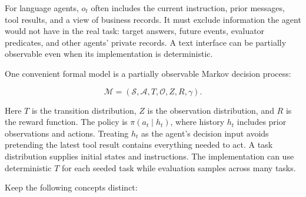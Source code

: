 \documentclass[
  11pt,
  letterpaper,
]{article}
\begin{document}
For language agents, \(o_t\) often includes the current instruction,
prior messages, tool results, and a view of business records. It must
exclude information the agent would not have in the real task: target
answers, future events, evaluator predicates, and other agents' private
records. A text interface can be partially observable even when its
implementation is deterministic.

One convenient formal model is a partially observable Markov decision
process:

\[\mathcal{M}=(\mathcal{S},\mathcal{A},T,\mathcal{O},Z,R,\gamma).\]

Here \(T\) is the transition distribution, \(Z\) is the observation
distribution, and \(R\) is the reward function. The policy is
\(\pi(a_t\mid h_t)\), where history \(h_t\) includes prior observations
and actions. Treating \(h_t\) as the agent's decision input avoids
pretending the latest tool result contains everything needed to act. A
task distribution supplies initial states and instructions. The
implementation can use deterministic \(T\) for each seeded task while
evaluation samples across many tasks.

Keep the following concepts distinct:
\end{document}
